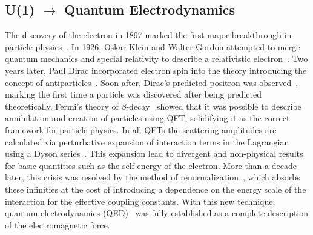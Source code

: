 \subsection{U(1) \texorpdfstring{$\rightarrow$}{-} Quantum Electrodynamics}

The discovery of the electron in 1897 marked the first major breakthrough in particle physics~\cite{ThomsonElectron}.
In 1926, Oskar Klein and Walter Gordon attempted to merge quantum mechanics and special relativity to describe a relativistic electron~\cite{Klein1926,Gordon1926}.
Two years later, Paul Dirac incorporated electron spin into the theory introducing the concept of antiparticles~\cite{Dirac1928}.
Soon after, Dirac's predicted positron was observed~\cite{PositiveElectron}, marking the first time a particle was discovered after being predicted theoretically.
Fermi's theory of $\beta$-decay~\cite{Fermi1934} showed that it was possible to describe annihilation and creation of particles using QFT\@, solidifying it as the correct framework for particle physics.
In all QFTs the scattering amplitudes are calculated via perturbative expansion of interaction terms in the Lagrangian using a Dyson series~\cite{AlexQED4}.
This expansion lead to divergent and non-physical results for basic quantities such as the self-energy of the electron.
More than a decade later, this crisis was resolved by the method of renormalization~\cite{Renorm1,Renorm2,Renorm3,Renorm4,Renorm5,Renorm6,Renorm7,Renorm8,Renorm9,Renorm10,Renorm11,Renorm12}, which absorbs these infinities at the cost of introducing a dependence on the energy scale of the interaction for the effective coupling constants.
With this new technique, quantum electrodynamics (QED)~\cite{AlexQED1,AlexQED2,AlexQED3} was fully established as a complete description of the electromagnetic force.

